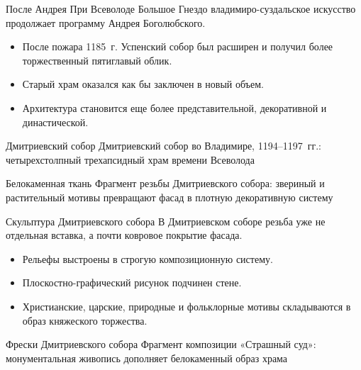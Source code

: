 \begin{frame}{После Андрея}
  При Всеволоде Большое Гнездо владимиро-суздальское искусство
  продолжает программу Андрея Боголюбского.

  \begin{itemize}
    \item После пожара 1185~г. Успенский собор был расширен
          и получил более торжественный пятиглавый облик.
    \item Старый храм оказался как бы заключен в новый объем.
    \item Архитектура становится еще более представительной,
          декоративной и династической.
  \end{itemize}
\end{frame}

\begin{frame}{Дмитриевский собор}
    {Дмитриевский собор во Владимире, 1194--1197~гг.:
     четырехстолпный трехапсидный храм времени Всеволода}
\end{frame}

\begin{frame}{Белокаменная ткань}
    {Фрагмент резьбы Дмитриевского собора:
     звериный и растительный мотивы превращают фасад
     в плотную декоративную систему}
\end{frame}

\begin{frame}{Скульптура Дмитриевского собора}
  В Дмитриевском соборе резьба уже не отдельная вставка,
  а почти ковровое покрытие фасада.

  \begin{itemize}
    \item Рельефы выстроены в строгую композиционную систему.
    \item Плоскостно-графический рисунок подчинен стене.
    \item Христианские, царские, природные и фольклорные мотивы
          складываются в образ княжеского торжества.
  \end{itemize}
\end{frame}

\begin{frame}{Фрески Дмитриевского собора}
    {Фрагмент композиции «Страшный суд»:
     монументальная живопись дополняет белокаменный образ храма}
\end{frame}

